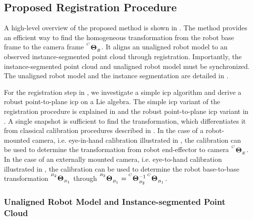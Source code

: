 
\subsection{Proposed Registration Procedure}
\label{c1:sec:proposed_calibration_procedure}
A high-level overview of the proposed method is shown in . The method provides an efficient way to find the homogeneous transformation from the robot base frame to the camera frame ${}^{^C}\mathbf{\Theta}_{_B}$. It aligns an unaligned robot model to an observed instance-segmented point cloud through registration. Importantly, the instance-segmented point cloud and unaligned robot model must be synchronized. The unaligned robot model and the instance segmentation are detailed in . 

For the registration step in , we investigate a simple \gls{icp} algorithm and derive a robust point-to-plane \gls{icp} on a Lie algebra. The simple \gls{icp} variant of the registration procedure is explained in  and the robust point-to-plane \gls{icp} variant in . A single snapshot is sufficient to find the transformation, which differentiates it from classical calibration procedures described in . In the case of a robot-mounted camera, i.e. eye-in-hand calibration illustrated in , the calibration can be used to determine the transformation from robot end-effector to camera ${}^{^C}\mathbf{\Theta}_{_E}$. In the case of an externally mounted camera, i.e. eye-to-hand calibration illustrated in , the calibration can be used to determine the robot base-to-base transformation ${}^{^{B_2}}\mathbf{\Theta}_{_{B_1}}$ through ${}^{^{B_2}}\mathbf{\Theta}_{_{B_1}} = {}^{^C}\mathbf{\Theta}_{_{B_2}}^{-1}\,{}^{^C}\mathbf{\Theta}_{_{B_1}}$.

\subsubsection{Unaligned Robot Model and Instance-segmented Point Cloud}
\label{c1:sec:unaligned_robot_model_and_instance_segmented_point_cloud}
